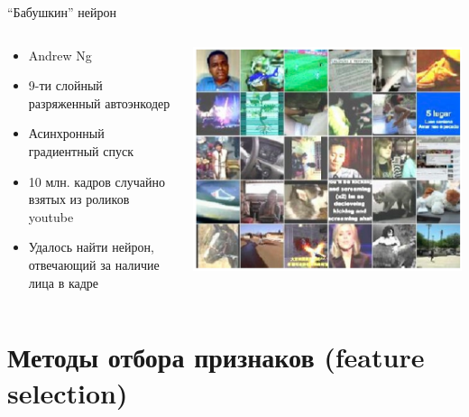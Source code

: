 \documentclass[10pt]{beamer}
\begin{document}
\begin{frame}{``Бабушкин'' нейрон}
\begin{columns}[C]
    \begin{column}{.5\textwidth}
    \begin{itemize}
    \item Andrew Ng
    \item 9-ти слойный разряженный автоэнкодер
    \item Асинхронный градиентный спуск
    \item 10 млн. кадров случайно взятых из роликов youtube
    \item Удалось найти нейрон, отвечающий за наличие лица в кадре
    \end{itemize}
    \end{column}
    \begin{column}{.5\textwidth}
    \includegraphics[width=\textwidth]{images/youtube.png}
    \end{column}
\end{columns}
\end{frame}

\section{Методы отбора признаков (feature selection)}
\end{document}
